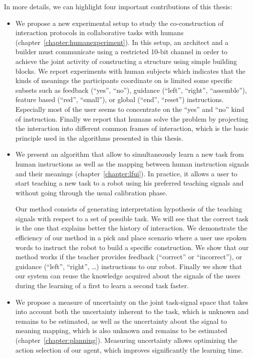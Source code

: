 In more details, we can highlight four important contributions of this thesis:

\begin{itemize}

\item We propose a new experimental setup to study the co-construction of interaction protocols in collaborative tasks with humans \cite{vollmer2014studying} (chapter~\ref{chapter:humanexperiment}). In this setup, an architect and a builder must communicate using a restricted 10-bit channel in order to achieve the joint activity of constructing a structure using simple building blocks. We report experiments with human subjects which indicates that the kinds of meanings the participants coordinate on is limited some specific subsets such as feedback (``yes'', ``no''), guidance (``left'', ``right'', ``assemble''), feature based (``red'', ``small''), or global (``end'', ``reset'') instructions. Especially most of the user seems to concentrate on the ``yes'' and ``no'' kind of instruction. Finally we report that humans solve the problem by projecting the interaction into different common frames of interaction, which is the basic principle used in the algorithms presented in this thesis.

\item  We present an algorithm that allow to simultaneously learn a new task from human instructions as well as the mapping between human instruction signals and their meanings \cite{grizou2013interactive,grizou2013robot,grizou2014robot,grizou2014calibration,grizou2014interactive} (chapter~\ref{chapter:lfui}). In practice, it allows a user to start teaching a new task to a robot using his preferred teaching signals and without going through the usual calibration phase.  

Our method consists of generating interpretation hypothesis of the teaching signals with respect to a set of possible task. We will see that the correct task is the one that explains better the history of interaction. We demonstrate the efficiency of our method in a pick and place scenario where a user use spoken words to instruct the robot to build a specific construction. We show that our method works if the teacher provides feedback (``correct'' or ``incorrect''), or guidance (``left'', ``right'', \ldots) instructions to our robot. Finally we show that our system can reuse the knowledge acquired about the signals of the users during the learning of a first to learn a second task faster.

\item We propose a measure of uncertainty on the joint task-signal space that takes into account both the uncertainty inherent to the task, which is unknown and remains to be estimated, as well as the uncertainty about the signal to meaning mapping, which is also unknown and remains to be estimated \cite{grizou2014calibration,grizou2014interactive} (chapter~\ref{chapter:planning}). Measuring uncertainty allows optimizing the action selection of our agent, which improves significantly the learning time.


\end{itemize}
